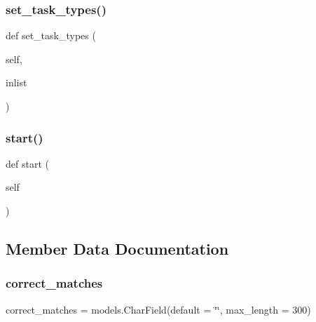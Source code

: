 \subsubsection{\texorpdfstring{set\_task\_types()}{set\_task\_types()}}
{\footnotesize\ttfamily def set\+\_\+task\+\_\+types (\begin{DoxyParamCaption}\item[{}]{self,  }\item[{}]{inlist }\end{DoxyParamCaption})}

\mbox{\label{classdynamicfilterapp_1_1models_1_1_i_p___pair_af1af6ddf04f00f958949618f79c33b82}} 
\subsubsection{\texorpdfstring{start()}{start()}}
{\footnotesize\ttfamily def start (\begin{DoxyParamCaption}\item[{}]{self }\end{DoxyParamCaption})}



\subsection{Member Data Documentation}
\mbox{\label{classdynamicfilterapp_1_1models_1_1_i_p___pair_afa7f671131faeb023ff23ff8593cc029}} 
\subsubsection{\texorpdfstring{correct\_matches}{correct\_matches}}
{\footnotesize\ttfamily correct\+\_\+matches = models.\+Char\+Field(default = \char`\"{}\char`\"{}, max\+\_\+length = 300)\hspace{0.3cm}{\ttfamily [static]}}

\mbox{\label{classdynamicfilterapp_1_1models_1_1_i_p___pair_aa18736cc12f8beb112bd108c5a09ef8d}} 
